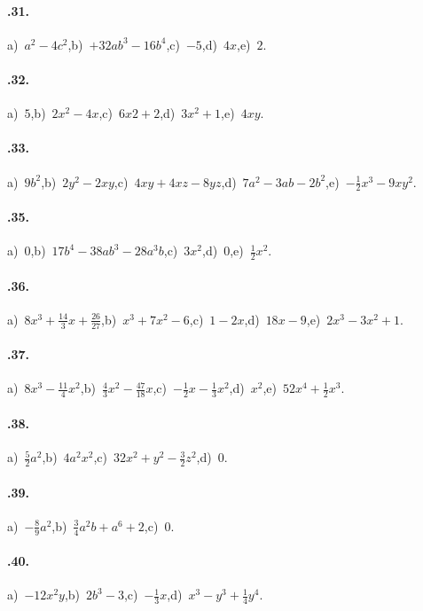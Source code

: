 \paragraph{\thechapter.31.} a)~$a^{2}-4c^{2}$,\quad b)~$+32ab^{3}-16b^{4}$,\quad c)~$-5$,\quad d)~$4x$,\quad e)~$2$.
\paragraph{\thechapter.32.} a)~$5$,\quad b)~$2x^{2}-4x$,\quad c)~$6x{2}+2$,\quad d)~$3x^{2}+1$,\quad e)~$4xy$.
\paragraph{\thechapter.33.} a)~$9b^2$,\quad b)~$2y^{2}-2xy$,\quad c)~$4xy+4xz-8yz$,\quad d)~$7a^2-3ab-2b^2$,\quad e)~$-\frac{1}{2}x^{3}-9xy^{2}$.
\paragraph{\thechapter.35.} a)~$0$,\quad b)~$17b^{4}-38{ab}^{3}-28a^{3}b$,\quad c)~$3x^{2}$,\quad d)~$0$,\quad e)~$\frac{1}{2}x^{2}$.
\paragraph{\thechapter.36.} a)~$8x^{3}+\frac{14}{3}x+\frac{26}{27}$,\quad b)~$x^{3}+7x^{2}-6$,\quad c)~$1-2x$,\quad d)~$18x-9$,\quad e)~$2x^3-3x^2+1$.
\paragraph{\thechapter.37.} a)~$8x^{3}-\frac{11}{4}x^{2}$,\quad b)~$\frac{4}{3}x^{2}-\frac{47}{18}x$,\quad c)~$-{\frac{1}{2}}x-\frac{1}{3}x^{2}$,\quad d)~$x^2$,\quad e)~$52x^4+\frac{1}{2}x^3$.
\paragraph{\thechapter.38.} a)~$\frac{5}{2}a^{2}$,\quad b)~$4a^{2}x^{2}$,\quad c)~$32x^{2}+y^{2}-\frac{3}{2}z^{2}$,\quad d)~$0$.
\paragraph{\thechapter.39.} a)~$-\frac{8}{9}a^{2}$,\quad b)~$\frac{3}{4}a^{2}b+a^{6}+2$,\quad c)~$0$.
\paragraph{\thechapter.40.} a)~$-12x^{2}y$,\quad b)~$2b^3-3$,\quad c)~$-\frac{1}{3}x$,\quad d)~$x^3-y^3+\frac{1}{4}y^4$.
